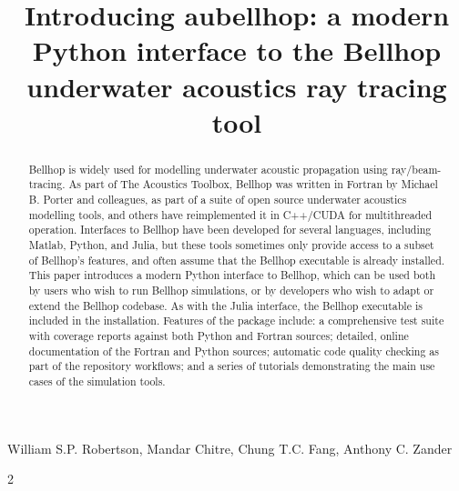 \documentclass{internoise2026-wr}
\begin{document}
\title{Introducing aubellhop: a modern Python interface to the Bellhop underwater acoustics ray tracing tool}

\maketitle

  \begin{flushleft}
    William S.P. Robertson,
    Mandar Chitre,
    Chung T.C. Fang,
    Anthony C. Zander


    \begin{multicols}{2} %
    \end{multicols}
  \end{flushleft}

\begin{abstract}
Bellhop is widely used for modelling underwater acoustic propagation using ray/beam-tracing. As part of The Acoustics Toolbox, Bellhop was written in Fortran by Michael B. Porter and colleagues, as part of a suite of open source underwater acoustics modelling tools, and others have reimplemented it in C++/CUDA for multithreaded operation. Interfaces to Bellhop have been developed for several languages, including Matlab, Python, and Julia, but these tools sometimes only provide access to a subset of Bellhop's features, and often assume that the Bellhop executable is already installed. This paper introduces a modern Python interface to Bellhop, which can be used both by users who wish to run Bellhop simulations, or by developers who wish to adapt or extend the Bellhop codebase. As with the Julia interface, the Bellhop executable is included in the installation. Features of the package include: a comprehensive test suite with coverage reports against both Python and Fortran sources; detailed, online documentation of the Fortran and Python sources; automatic code quality checking as part of the repository workflows; and a series of tutorials demonstrating the main use cases of the simulation tools.
\end{abstract}
\end{document}
